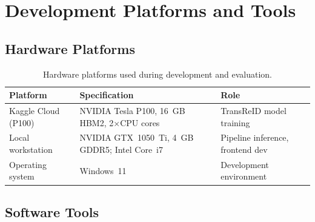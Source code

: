 \chapter{Development Platforms and Tools}

\section{Hardware Platforms}

\begin{table}[htbp]
\centering
\caption{Hardware platforms used during development and evaluation.}
\label{tab:hardware}
\begin{tabular}{lll}
\hline
\textbf{Platform} & \textbf{Specification} & \textbf{Role} \\ \hline
Kaggle Cloud (P100)  & NVIDIA Tesla P100, 16~GB HBM2, 2$\times$CPU cores & TransReID model training \\
Local workstation    & NVIDIA GTX~1050~Ti, 4~GB GDDR5; Intel Core~i7 & Pipeline inference, frontend dev \\
Operating system     & Windows~11                                       & Development environment \\ \hline
\end{tabular}
\end{table}

\section{Software Tools}

